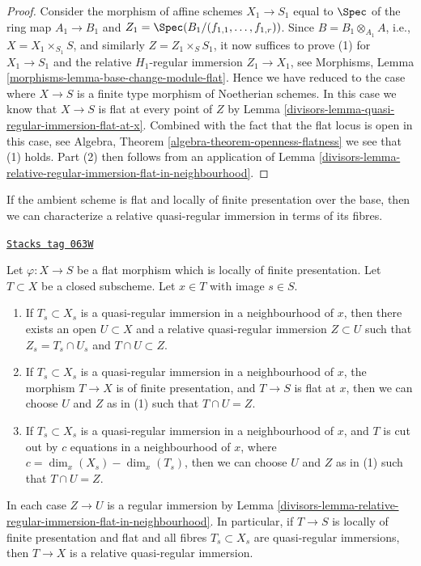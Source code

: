 \begin{proof}
\medskip\noindent
Consider the morphism of affine schemes
$X_1 \to S_1$ equal to $\Spec$ of the
ring map $A_1 \to B_1$ and
$Z_1 = \Spec(B_1/(f_{1, 1}, \ldots, f_{1, r}))$.
Since $B = B_1 \otimes_{A_1} A$, i.e., $X = X_1 \times_{S_1} S$,
and similarly $Z = Z_1 \times_S S_1$,
it now suffices to prove (1) for $X_1 \to S_1$ and the relative
$H_1$-regular immersion $Z_1 \to X_1$, see
Morphisms, Lemma \ref{morphisms-lemma-base-change-module-flat}.
Hence we have reduced to the case where $X \to S$ is a finite type
morphism of Noetherian schemes.
In this case we know that $X \to S$ is flat at every
point of $Z$ by
Lemma \ref{divisors-lemma-quasi-regular-immersion-flat-at-x}.
Combined with the fact that the flat locus is open in this case, see
Algebra, Theorem \ref{algebra-theorem-openness-flatness}
we see that (1) holds. Part (2) then follows from an application of
Lemma \ref{divisors-lemma-relative-regular-immersion-flat-in-neighbourhood}.
\end{proof}

If the ambient scheme is flat and locally of finite presentation over
the base, then we can characterize a relative
quasi-regular immersion in terms of its fibres.

\begin{lemma}
\label{divisors-lemma-fibre-quasi-regular}
\href{https://stacks.math.columbia.edu/tag/063W}{\texttt{Stacks tag 063W}}

Let $\varphi : X \to S$ be a flat morphism which is locally of finite
presentation. Let $T \subset X$ be a closed subscheme.
Let $x \in T$ with image $s \in S$.
\begin{enumerate}
\item If $T_s \subset X_s$ is a quasi-regular immersion
in a neighbourhood of $x$, then there exists an open
$U \subset X$ and a relative quasi-regular immersion
$Z \subset U$ such that $Z_s = T_s \cap U_s$ and $T \cap U \subset Z$.
\item If $T_s \subset X_s$ is a quasi-regular immersion
in a neighbourhood of $x$, the morphism $T \to X$ is of finite
presentation, and $T \to S$ is flat at $x$, then we can choose $U$ and
$Z$ as in (1) such that $T \cap U = Z$.
\item If $T_s \subset X_s$ is a quasi-regular immersion in a neighbourhood
of $x$, and $T$ is cut out by $c$ equations in a neighbourhood of $x$,
where $c = \dim_x(X_s) - \dim_x(T_s)$, then we can choose $U$ and $Z$ as in (1)
such that $T \cap U = Z$.
\end{enumerate}
In each case $Z \to U$ is a regular immersion by
Lemma \ref{divisors-lemma-relative-regular-immersion-flat-in-neighbourhood}.
In particular, if $T \to S$ is locally of finite presentation and flat and
all fibres $T_s \subset X_s$ are quasi-regular immersions, then
$T \to X$ is a relative quasi-regular immersion.
\end{lemma}

